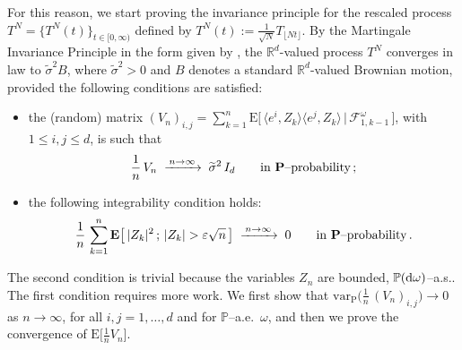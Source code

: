 \documentclass[a4paper,reqno,11pt]{amsart}
\numberwithin{equation}{section}
\newcommand{\bbP}{{\ensuremath{\mathbb P}} }
\newcommand{\cF}{{\ensuremath{\mathcal F}} }
\newcommand{\gs}{\sigma}
\newcommand{\go}{\omega}
\renewcommand{\tilde}{\widetilde}          %
\newcommand{\dd}{\text{\rm d}}             %
\newcommand{\R}{\mathbb{R}}
\def\bP{\ensuremath{\bs{\mathrm{P}}}}
\def\bE{\ensuremath{\bs{\mathrm{E}}}}
\def\bs{\boldsymbol}
\begin{document}
For this reason, we start proving the invariance principle for the
rescaled process $T^N = \{T^N(t)\}_{t \in [0,\infty)}$
defined by $T^N(t) := \frac{1}{\sqrt N} T_{\lfloor Nt \rfloor}$.
By the Martingale Invariance Principle
in the form given by \cite[Corollary~3.24, Ch.~VIII]{cf:JS},
the $\R^d$-valued process $T^N$ converges in law to $\tilde \gs^2 B$,
where $\tilde \gs^2 > 0$ and $B$ denotes a standard $\R^d$-valued Brownian motion,
provided the following conditions are satisfied:
\begin{itemize}
\item[(i)] the (random) matrix
$(V_n)_{i,j} = \sum_{k=1}^n \bE \big[\, \langle e^i,Z_k\rangle \langle e^j, Z_k\rangle \,\big|
\,\cF_{1,k-1}^\go \,\big]$, with $1 \le i,j \le d$, is such that
\begin{equation}
\label{eq:cond1}
\frac 1n \, V_n \;\xrightarrow{\,n\to\infty\,}\; \tilde \sigma^2\, I_d \qquad
\text{in $\bP$--probability\,;}
\end{equation}
\item[(ii)] the following integrability condition holds:
\begin{equation}
\label{eq:cond2}
\frac 1n \, \sum_{k=1}^n \bE\big[ \, |Z_k|^2 \,;\, |Z_k| > \varepsilon \sqrt{n} \, \big]
\;\xrightarrow{\,n\to\infty\,}\; 0 \qquad \text{in $\bP$--probability\,.}
\end{equation}
\end{itemize}
The second condition is trivial because the variables $Z_n$ are bounded,
$\bbP(\dd\go)$--a.s.. The first condition requires more work.
We first show that $\mathrm{var}_{\bP} \big( \frac 1n \, (V_n)_{i,j} \big) \to 0$
as $n \to \infty$, for all $i,j=1,\dots,d$ and for $\bbP$--a.e.~$\omega$,
and then we prove the convergence of $\bE \big[ \frac 1n V_n \big]$.
\end{document}
